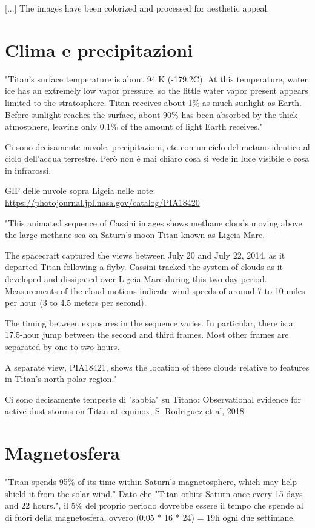 \documentclass[a4paper,10pt,openany,oneside]{memoir}
\begin{document}
[...] The images have been colorized and processed for aesthetic appeal.


\section{Clima e precipitazioni}

"Titan's surface temperature is about 94 K (-179.2C). At this temperature, water ice has an extremely low vapor pressure, so the little water vapor present appears limited to the stratosphere. Titan receives about 1\% as much sunlight as Earth. Before sunlight reaches the surface, about 90\% has been absorbed by the thick atmosphere, leaving only 0.1\% of the amount of light Earth receives."

Ci sono decisamente nuvole, precipitazioni, etc con un ciclo del metano identico al ciclo dell'acqua terrestre. Però non è mai chiaro cosa si vede in luce visibile e cosa in infrarossi.

GIF delle nuvole sopra Ligeia nelle note: \url{https://photojournal.jpl.nasa.gov/catalog/PIA18420}

"This animated sequence of Cassini images shows methane clouds moving above the large methane sea on Saturn's moon Titan known as Ligeia Mare.

The spacecraft captured the views between July 20 and July 22, 2014, as it departed Titan following a flyby. Cassini tracked the system of clouds as it developed and dissipated over Ligeia Mare during this two-day period. Measurements of the cloud motions indicate wind speeds of around 7 to 10 miles per hour (3 to 4.5 meters per second).

The timing between exposures in the sequence varies. In particular, there is a 17.5-hour jump between the second and third frames. Most other frames are separated by one to two hours.

A separate view, PIA18421, shows the location of these clouds relative to features in Titan's north polar region."

Ci sono decisamente tempeste di "sabbia" su Titano: Observational evidence for active dust storms on
Titan at equinox, S. Rodriguez et al, 2018

\section{Magnetosfera}

"Titan spends 95\% of its time within Saturn's magnetosphere, which may help shield it from the solar wind." Dato che "Titan orbits Saturn once every 15 days and 22 hours.", il 5\% del proprio periodo dovrebbe essere il tempo che spende al di fuori della magnetosfera, ovvero (0.05 * 16 * 24) = 19h ogni due settimane.
\end{document}
